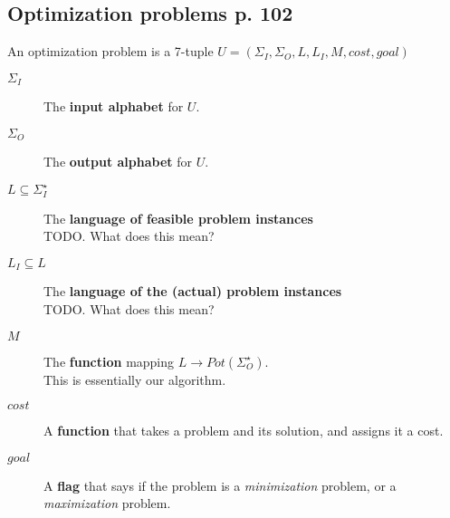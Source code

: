 \documentclass[a4paper,10pt]{article}
\begin{document}
\subsection{Optimization problems p. 102}
An optimization problem is a 7-tuple $U = (\Sigma _I, \Sigma _O, L, L_I, M, cost, goal)$
\begin{description}
\item[$\Sigma _I$] 											The \textbf{input alphabet} for $U$.
\item[$\Sigma _ O$] 										The \textbf{output alphabet} for $U$.
\item[$L \subseteq \Sigma_{I}^{\star}$]	The \textbf{language of feasible problem instances} \hfill \\
																				TODO. What does this mean?
\item[$L_I \subseteq L$]								The \textbf{language of the (actual) problem instances} \hfill \\
																				TODO. What does this mean?
\item[$M$] 															The \textbf{function} mapping $L \rightarrow Pot(\Sigma_{O}^\star)$. \hfill \\
																				This is essentially our algorithm.
\item[$cost$]														A \textbf{function} that takes a problem and its solution, and assigns it a cost.
\item[$goal$]														A \textbf{flag} that says if the problem is a \emph{minimization} problem, or a \emph{maximization} problem.
\end{description}
\end{document}
